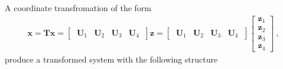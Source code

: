 \documentclass[letterpaper,10pt,english]{jupyterBook}
\begin{document}
\sphinxAtStartPar
A coordinate transfromation of the form
\begin{equation*}
\begin{split}\mathbf{x} = \mathbf{T} \mathbf{x} = \begin{bmatrix} \ \mathbf{U}_1 & \mathbf{U}_2 & \mathbf{U}_3 & \mathbf{U}_4 \ \end{bmatrix} \mathbf{z} = \begin{bmatrix} \ \mathbf{U}_1 & \mathbf{U}_2 & \mathbf{U}_3 & \mathbf{U}_4 \ \end{bmatrix} \begin{bmatrix} \mathbf{z}_1 \\ \mathbf{z}_2 \\ \mathbf{z}_3 \\ \mathbf{z}_4 \end{bmatrix} \ ,\end{split}
\end{equation*}
\sphinxAtStartPar
produce a transformed system with the following structure
\end{document}
